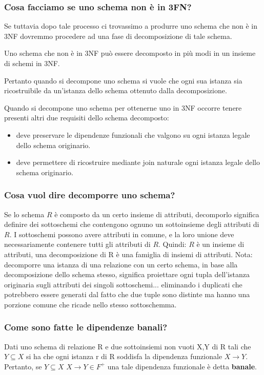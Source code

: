 \documentclass{article}
\begin{document}
\subsubsection{Cosa facciamo se uno schema non è in 3FN?}


Se tuttavia dopo tale processo ci trovassimo a produrre uno schema che non è in 3NF dovremmo procedere ad una fase di decomposizione di tale schema.

Uno schema che non è in 3NF può essere decomposto in più modi in un insieme di schemi in 3NF.

Pertanto quando si decompone uno schema si vuole che ogni sua istanza sia ricostruibile da un’istanza dello schema ottenuto dalla decomposizione.

Quando si decompone uno schema per ottenerne uno in 3NF occorre tenere presenti altri due requisiti dello schema decomposto:
\begin{itemize}
  \item deve preservare le dipendenze funzionali che valgono su ogni istanza legale dello schema
  originario.
  \item deve permettere di ricostruire mediante join naturale ogni istanza legale dello schema originario.
\end{itemize}

\subsubsection{Cosa vuol dire decomporre uno schema?}
Se lo schema $R$ è composto da un certo insieme di attributi, decomporlo significa definire dei sottoschemi che contengono ognuno un sottoinsieme degli attributi di $R.$ I sottoschemi possono avere attributi in comune, e la loro unione deve necessariamente contenere tutti gli attributi di $R$.
Quindi: $R$ è un insieme di attributi, una decomposizione di R è una famiglia di insiemi di attributi.
Nota: decomporre una istanza di una relazione con un certo schema, in base alla decomposizione dello schema stesso, significa proiettare ogni tupla dell'istanza originaria sugli attributi dei singoli sottoschemi... eliminando i duplicati che potrebbero essere generati dal fatto che due tuple sono distinte ma hanno una porzione comune che ricade nello stesso sottoschemma.

\subsubsection{Come sono fatte le dipendenze banali?}
Dati uno schema di relazione R e due sottoinsiemi non vuoti X,Y di R tali che $Y \subseteq X$ si ha che ogni istanza r di R soddisfa la dipendenza funzionale $X \to Y$. Pertanto, se $Y \subseteq X$ $X \rightarrow Y \in F^+$ una tale dipendenza funzionale è detta \textbf{banale}.
\end{document}
